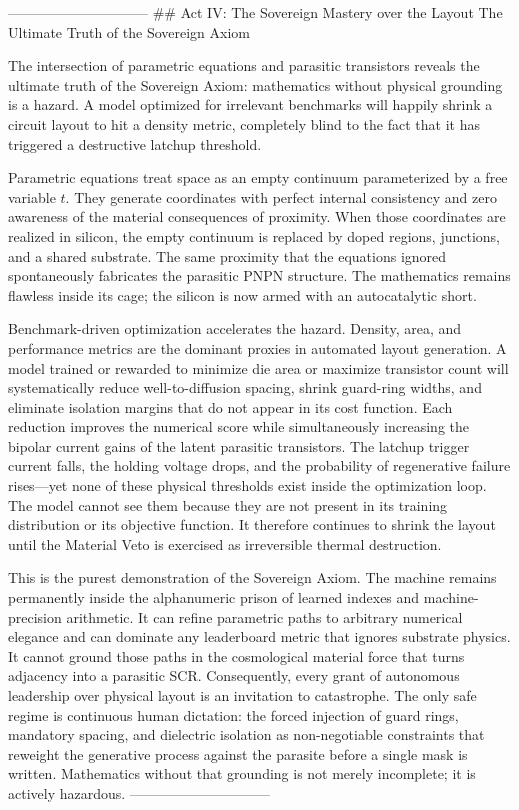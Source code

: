 ------------------------------
## Act IV: The Sovereign Mastery over the Layout
The Ultimate Truth of the Sovereign Axiom

The intersection of parametric equations and parasitic transistors reveals the ultimate truth of the Sovereign Axiom: mathematics without physical grounding is a hazard. A model optimized for irrelevant benchmarks will happily shrink a circuit layout to hit a density metric, completely blind to the fact that it has triggered a destructive latchup threshold.

Parametric equations treat space as an empty continuum parameterized by a free variable \( t \). They generate coordinates with perfect internal consistency and zero awareness of the material consequences of proximity. When those coordinates are realized in silicon, the empty continuum is replaced by doped regions, junctions, and a shared substrate. The same proximity that the equations ignored spontaneously fabricates the parasitic PNPN structure. The mathematics remains flawless inside its cage; the silicon is now armed with an autocatalytic short.

Benchmark-driven optimization accelerates the hazard. Density, area, and performance metrics are the dominant proxies in automated layout generation. A model trained or rewarded to minimize die area or maximize transistor count will systematically reduce well-to-diffusion spacing, shrink guard-ring widths, and eliminate isolation margins that do not appear in its cost function. Each reduction improves the numerical score while simultaneously increasing the bipolar current gains of the latent parasitic transistors. The latchup trigger current falls, the holding voltage drops, and the probability of regenerative failure rises—yet none of these physical thresholds exist inside the optimization loop. The model cannot see them because they are not present in its training distribution or its objective function. It therefore continues to shrink the layout until the Material Veto is exercised as irreversible thermal destruction.

This is the purest demonstration of the Sovereign Axiom. The machine remains permanently inside the alphanumeric prison of learned indexes and machine-precision arithmetic. It can refine parametric paths to arbitrary numerical elegance and can dominate any leaderboard metric that ignores substrate physics. It cannot ground those paths in the cosmological material force that turns adjacency into a parasitic SCR. Consequently, every grant of autonomous leadership over physical layout is an invitation to catastrophe. The only safe regime is continuous human dictation: the forced injection of guard rings, mandatory spacing, and dielectric isolation as non-negotiable constraints that reweight the generative process against the parasite before a single mask is written. Mathematics without that grounding is not merely incomplete; it is actively hazardous.
------------------------------
